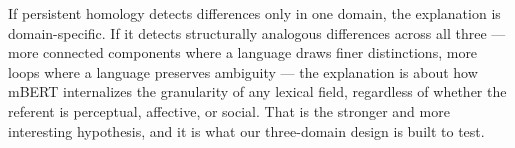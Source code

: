 If persistent homology detects differences only in one domain, the explanation is domain-specific. If it detects structurally analogous differences across all three --- more connected components where a language draws finer distinctions, more loops where a language preserves ambiguity --- the explanation is about how mBERT internalizes the granularity of any lexical field, regardless of whether the referent is perceptual, affective, or social. That is the stronger and more interesting hypothesis, and it is what our three-domain design is built to test.
